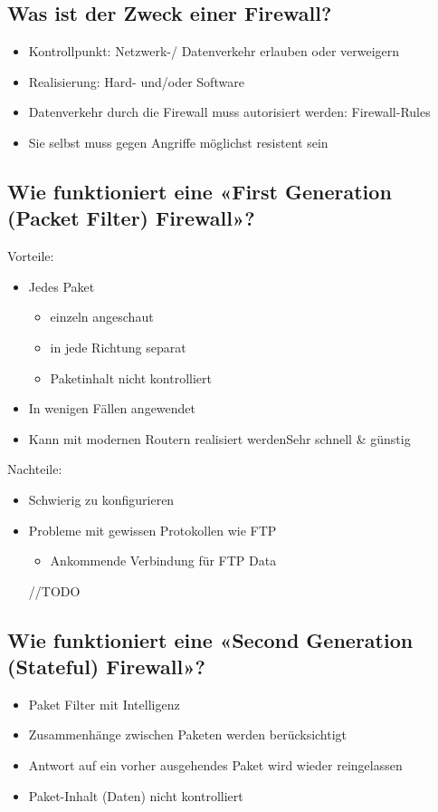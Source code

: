 \subsection*{Was ist der Zweck einer Firewall?}
\begin{itemize}
    \item Kontrollpunkt: Netzwerk-/ Datenverkehr erlauben oder verweigern
    \item Realisierung: Hard- und/oder Software
    \item Datenverkehr durch die Firewall muss autorisiert werden: Firewall-Rules
    \item Sie selbst muss gegen Angriffe möglichst resistent sein
\end{itemize}

\subsection*{Wie funktioniert eine «First Generation (Packet Filter) Firewall»?}
Vorteile:
\begin{itemize}
    \item Jedes Paket
    \begin{itemize}
        \item einzeln angeschaut
        \item in jede Richtung separat
        \item Paketinhalt nicht kontrolliert
    \end{itemize}
    \item In wenigen Fällen angewendet
    \item Kann mit modernen Routern realisiert werdenSehr schnell \& günstig
\end{itemize}
Nachteile:
\begin{itemize}
    \item Schwierig zu konfigurieren
    \item Probleme mit gewissen Protokollen wie FTP
    \begin{itemize}
        \item Ankommende Verbindung für FTP Data
    \end{itemize}
    //TODO
\end{itemize}

\subsection*{Wie funktioniert eine «Second Generation (Stateful) Firewall»?}
\begin{itemize}
    \item Paket Filter mit Intelligenz
    \item Zusammenhänge zwischen Paketen werden berücksichtigt
    \item Antwort auf ein vorher ausgehendes Paket wird wieder reingelassen
    \item Paket-Inhalt (Daten) nicht kontrolliert
\end{itemize}

